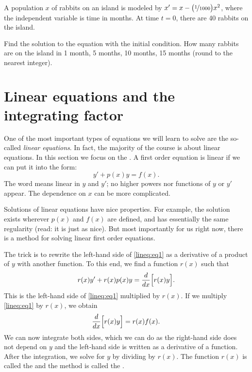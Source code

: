 \begin{exercise}
A population $x$ of rabbits on an island is modeled by
$x' = x- \bigl(\nicefrac{1}{1000} \bigr) x^2$, where the independent
variable is time in months.  At time $t=0$, there are 40 rabbits
on the island.
\begin{tasks}
\task Find the solution to the equation with the initial
condition.
\task
How many rabbits are on the island in 1 month, 5 months, 
10 months, 15 months (round to the nearest integer).
\end{tasks}
\end{exercise}


\sectionnewpage
\section{Linear equations and the integrating factor}
\label{intfactor:section}


One of the most important types of equations we will learn to solve are
the so-called
\emph{linear equations}.
In fact, the majority of the course is about linear
equations.  In this section we focus on the
\emph{}.
A first order equation is linear if we can put it
into the form:
\begin{equation} \label{lineq:eq1}
y' + p(x) y = f(x) .
\end{equation}
The word
 means linear in $y$ and $y'$;
no higher powers nor functions of $y$ or $y'$ appear.
The dependence on $x$ can be more
complicated.

Solutions of linear equations have nice properties.  For example, the
solution exists wherever $p(x)$ and $f(x)$ are defined, and has essentially the same
regularity (read: it is just as nice).  But most importantly for us right now,
there is a method for solving linear first order equations.

The trick is to rewrite the left-hand side
of \eqref{lineq:eq1} as a derivative of a product of $y$ with another
function.
To this end,
we find a function $r(x)$ such that
\begin{equation*}
r(x) y' + r(x) p(x) y = \frac{d}{dx}\Bigl[ r(x) y \Bigr] .
\end{equation*}
This is the left-hand side of
\eqref{lineq:eq1} multiplied by $r(x)$.  If we multiply \eqref{lineq:eq1} by
$r(x)$, we obtain
\begin{equation*}
\frac{d}{dx}\Bigl[ r(x) y \Bigr] = r(x)f(x) .
\end{equation*}
We can now integrate both sides, which we can do as
the right-hand side does not depend on $y$ and the left-hand side
is written as a derivative of a function.  After the integration, we solve for $y$
by dividing by $r(x)$.
The function $r(x)$ is called the \emph{} and the
method is called the \emph{}.

